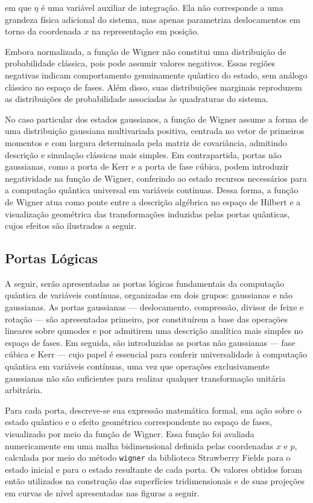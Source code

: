 \noindent em que $\eta$ é uma variável auxiliar de integração. Ela não corresponde a uma grandeza física adicional do sistema, mas apenas parametriza deslocamentos em torno da coordenada $x$ na representação em posição.

Embora normalizada, a função de Wigner não constitui uma distribuição de probabilidade clássica, pois pode assumir valores negativos. Essas regiões negativas indicam comportamento genuinamente quântico do estado, sem análogo clássico no espaço de fases. Além disso, suas distribuições marginais reproduzem as distribuições de probabilidade associadas às quadraturas do sistema.

No caso particular dos estados gaussianos, a função de Wigner assume a forma de uma distribuição gaussiana multivariada positiva, centrada no vetor de primeiros momentos e com largura determinada pela matriz de covariância, admitindo descrição e simulação clássicas mais simples. Em contrapartida, portas não gaussianas, como a porta de Kerr e a porta de fase cúbica, podem introduzir negatividade na função de Wigner, conferindo ao estado recursos necessários para a computação quântica universal em variáveis contínuas. Dessa forma, a função de Wigner atua como ponte entre a descrição algébrica no espaço de Hilbert e a visualização geométrica das transformações induzidas pelas portas quânticas, cujos efeitos são ilustrados a seguir.

\subsection{Portas Lógicas}

A seguir, serão apresentadas as portas lógicas fundamentais da computação quântica de variáveis contínuas, organizadas em dois grupos: gaussianas e não gaussianas. As portas gaussianas — deslocamento, compressão, divisor de feixe e rotação — são apresentadas primeiro, por constituírem a base das operações lineares sobre qumodes e por admitirem uma descrição analítica mais simples no espaço de fases. Em seguida, são introduzidas as portas não gaussianas — fase cúbica e Kerr — cujo papel é essencial para conferir universalidade à computação quântica em variáveis contínuas, uma vez que operações exclusivamente gaussianas não são suficientes para realizar qualquer transformação unitária arbitrária.

Para cada porta, descreve-se sua expressão matemática formal, sua ação sobre o estado quântico e o efeito geométrico correspondente no espaço de fases, visualizado por meio da função de Wigner. Essa função foi avaliada numericamente em uma malha bidimensional definida pelas coordenadas $x$ e $p$, calculada por meio do método \texttt{wigner} da biblioteca Strawberry Fields para o estado inicial e para o estado resultante de cada porta. Os valores obtidos foram então utilizados na construção das superfícies tridimensionais e de suas projeções em curvas de nível apresentadas nas figuras a seguir.

